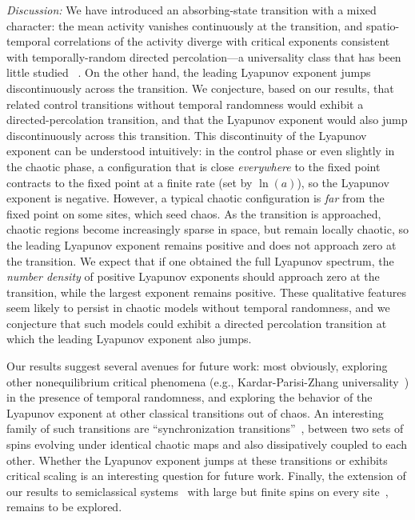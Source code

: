 \documentclass[twocolumn,amsmath,amssymb,floatfix,superscriptaddress,aps,prl]{revtex4-2}
\newcommand{\elisha}[1]{\textcolor{orange}{#1}}
\begin{document}
{\it Discussion:} We have introduced an absorbing-state transition with a mixed character: the mean activity vanishes continuously at the transition, and spatio-temporal correlations of the activity diverge with critical exponents consistent with temporally-random directed percolation---a universality class that has been little studied %
~\cite{IwanDPtemprand}. On the other hand, the leading Lyapunov exponent jumps discontinuously across the transition.  We conjecture, based on our results, that related control transitions without temporal randomness 
would exhibit a directed-percolation transition, and that the Lyapunov exponent would also jump discontinuously across this transition. 
%
This discontinuity of the Lyapunov exponent can be understood intuitively: in the control phase or even slightly in the chaotic phase, a configuration that is close \emph{everywhere} to the fixed point contracts to the fixed point at a finite rate (set by $\ln(a)$), so the Lyapunov exponent is negative. However, a typical chaotic configuration is \emph{far} from the fixed point on some sites, which seed chaos. As the transition is approached, chaotic regions become increasingly sparse in space, but remain locally chaotic, so the leading Lyapunov exponent remains positive and does not approach zero at the transition.  We expect that if one obtained the full Lyapunov spectrum, the {\it number density} of positive Lyapunov exponents should approach zero at the transition, while the largest exponent remains positive.  These qualitative features seem likely to persist in chaotic models without temporal randomness, and we conjecture that such models could exhibit a directed percolation transition at which the leading Lyapunov exponent also jumps. 

Our results suggest several avenues for future work: most obviously, exploring other nonequilibrium critical phenomena (e.g., Kardar-Parisi-Zhang universality~\cite{kpz1,kt_review}) in the presence of temporal randomness, and exploring the behavior of the Lyapunov exponent at other classical transitions out of chaos. An interesting family of such transitions are ``synchronization transitions''~\cite{ap2002}, between two sets of spins evolving under identical chaotic maps and also dissipatively coupled to each other. %
Whether the Lyapunov exponent jumps at these transitions or exhibits critical scaling is an interesting question for future work. Finally, the extension of our results to semiclassical systems~\cite{ap_review,MP2026,MP2026} with large but finite spins on every site~\cite{DL2014}, remains to be explored. 
\end{document}

